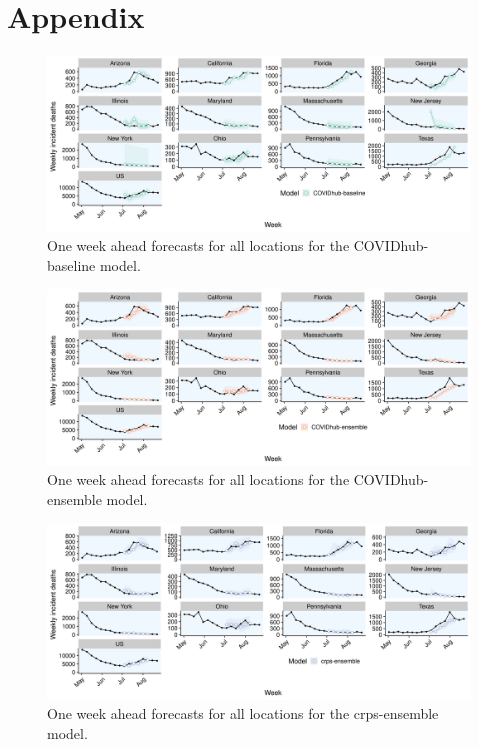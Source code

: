 \documentclass[
]{book}
\begin{document}
\hypertarget{appendix-appendix}{%
\appendix}


\hypertarget{appendix}{%
\chapter{Appendix}\label{appendix}}

\begin{figure}
\includegraphics[width=1\linewidth]{../visualisation/chapter-5-results/scenario-baseline/APPENDIX-COVIDhub-baseline-forecasts} \caption{One week ahead forecasts for all locations for the COVIDhub-baseline model.}\label{fig:predictions-baseline}
\end{figure}

\begin{figure}
\includegraphics[width=1\linewidth]{../visualisation/chapter-5-results/scenario-baseline/APPENDIX-COVIDhub-ensemble-forecasts} \caption{One week ahead forecasts for all locations for the COVIDhub-ensemble model.}\label{fig:predictions-covid-ensembe}
\end{figure}

\begin{figure}
\includegraphics[width=1\linewidth]{../visualisation/chapter-5-results/scenario-baseline/APPENDIX-crps-ensemble-forecasts} \caption{One week ahead forecasts for all locations for the crps-ensemble model.}\label{fig:predictions-crps}
\end{figure}
\end{document}
